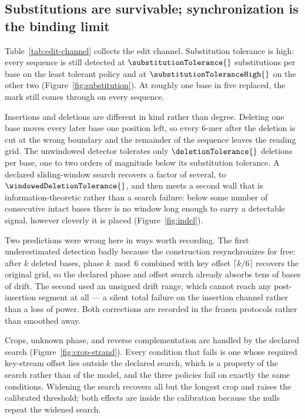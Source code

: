 

\subsection{Substitutions are survivable; synchronization is the binding limit}

Table~\ref{tab:edit-channel} collects the edit channel. Substitution tolerance is high: every sequence
is still detected at $\substitutionTolerance{}$ substitutions per base on the least tolerant policy
and at $\substitutionToleranceHigh{}$ on the other two (Figure~\ref{fig:substitution}). At roughly one
base in five replaced, the mark still comes through on every sequence.

Insertions and deletions are different in kind rather than degree. Deleting one base moves every later
base one position left, so every 6-mer after the deletion is cut at the wrong boundary and the
remainder of the sequence leaves the reading grid. The unwindowed detector tolerates only
$\deletionTolerance{}$ deletions per base, one to two orders of magnitude below its substitution
tolerance. A declared sliding-window search recovers a factor of several, to
$\windowedDeletionTolerance{}$, and then meets a second wall that is information-theoretic rather than
a search failure: below some number of consecutive intact bases there is no window long enough to
carry a detectable signal, however cleverly it is placed (Figure~\ref{fig:indel}).

Two predictions were wrong here in ways worth recording. The first underestimated detection badly
because the construction resynchronizes for free: after $k$ deleted bases, phase $k \bmod 6$ combined
with key offset $\lceil k/6 \rceil$ recovers the original grid, so the declared phase and offset search
already absorbs tens of bases of drift. The second used an unsigned drift range, which cannot reach any
post-insertion segment at all --- a silent total failure on the insertion channel rather than a loss of
power. Both corrections are recorded in the frozen protocols rather than smoothed away.



Crops, unknown phase, and reverse complementation are handled by the declared search
(Figure~\ref{fig:crop-strand}). Every condition that fails is one whose required key-stream offset lies
outside the declared search, which is a property of the search rather than of the model, and the three
policies fail on exactly the same conditions. Widening the search recovers all but the longest crop and
raises the calibrated threshold; both effects are inside the calibration because the nulls repeat the
widened search.

